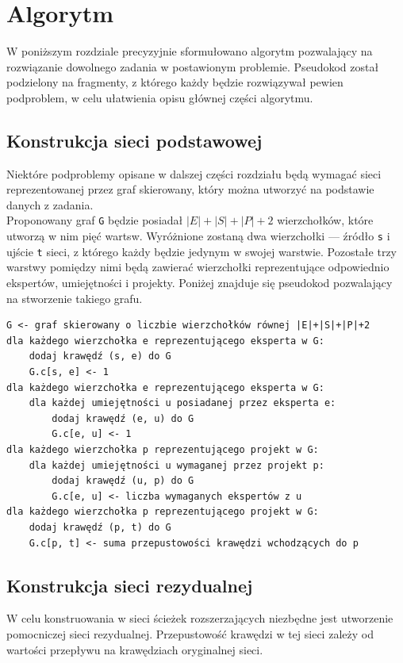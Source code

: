 \documentclass[12pt,a4paper]{article}
\theoremstyle{definition}
\begin{document}
\section{Algorytm}
\label{sec:algorithm}
W poniższym rozdziale precyzyjnie sformułowano algorytm pozwalający na rozwiązanie dowolnego zadania w postawionym problemie. Pseudokod został podzielony na fragmenty, z którego każdy będzie rozwiązywał pewien podproblem, w celu ułatwienia opisu głównej części algorytmu.

\subsection{Konstrukcja sieci podstawowej}
Niektóre podproblemy opisane w dalszej części rozdziału będą wymagać sieci reprezentowanej przez graf skierowany, który można utworzyć na podstawie danych z zadania.\\

\noindent
Proponowany graf \texttt{G} będzie posiadał $|E|+|S|+|P|+2$ wierzchołków, które utworzą w nim pięć wartsw. Wyróżnione zostaną dwa wierzchołki --- źródło \texttt{s} i ujście \texttt{t} sieci, z którego każdy będzie jedynym w swojej warstwie. Pozostałe trzy warstwy pomiędzy nimi będą zawierać wierzchołki reprezentujące odpowiednio ekspertów, umiejętności i projekty. Poniżej znajduje się pseudokod pozwalający na stworzenie takiego grafu.\\

\begin{tcolorbox}[title=Konstrukcja sieci podstawowej]
\begin{verbatim}
G <- graf skierowany o liczbie wierzchołków równej |E|+|S|+|P|+2
dla każdego wierzchołka e reprezentującego eksperta w G:
    dodaj krawędź (s, e) do G
    G.c[s, e] <- 1
dla każdego wierzchołka e reprezentującego eksperta w G:
    dla każdej umiejętności u posiadanej przez eksperta e:
        dodaj krawędź (e, u) do G
        G.c[e, u] <- 1
dla każdego wierzchołka p reprezentującego projekt w G:
    dla każdej umiejętności u wymaganej przez projekt p:
        dodaj krawędź (u, p) do G
        G.c[e, u] <- liczba wymaganych ekspertów z u
dla każdego wierzchołka p reprezentującego projekt w G:
    dodaj krawędź (p, t) do G
    G.c[p, t] <- suma przepustowości krawędzi wchodzących do p
\end{verbatim}
\end{tcolorbox}

\subsection{Konstrukcja sieci rezydualnej}
W celu konstruowania w sieci ścieżek rozszerzających niezbędne jest utworzenie pomocniczej sieci rezydualnej. Przepustowość krawędzi w tej sieci zależy od wartości przepływu na krawędziach oryginalnej sieci.\\
\end{document}

